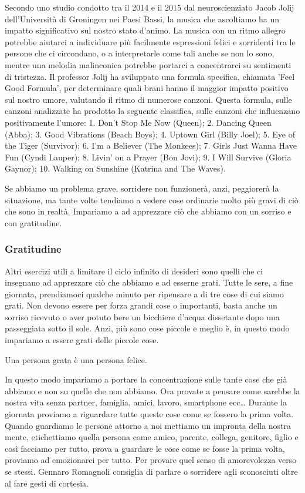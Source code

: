 \documentclass[12pt]{book} %
\begin{document}
Secondo uno studio condotto tra il 2014 e il 2015 dal neuroscienziato Jacob Jolij dell'Università di Groningen nei Paesi Bassi, la musica che ascoltiamo ha un impatto significativo sul nostro stato d'animo. La musica con un ritmo allegro potrebbe aiutarci a individuare più facilmente espressioni felici e sorridenti tra le persone che ci circondano, o a interpretarle come tali anche se non lo sono, mentre una melodia malinconica potrebbe portarci a concentrarci su sentimenti di tristezza. Il professor Jolij ha sviluppato una formula specifica, chiamata 'Feel Good Formula', per determinare quali brani hanno il maggior impatto positivo sul nostro umore, valutando il ritmo di numerose canzoni. Questa formula, sulle canzoni analizzate ha prodotto la seguente classifica, sulle canzoni che influenzano positivamente l'umore: 1. Don't Stop Me Now (Queen); 2. Dancing Queen (Abba); 3. Good Vibrations (Beach Boys); 4. Uptown Girl (Billy Joel); 5. Eye of the Tiger (Survivor); 6. I'm a Believer (The Monkees); 7. Girls Just Wanna Have Fun (Cyndi Lauper); 8. Livin' on a Prayer (Bon Jovi); 9. I Will Survive (Gloria Gaynor); 10. Walking on Sunshine (Katrina and The Waves).

Se abbiamo un problema grave, sorridere non funzionerà, anzi, peggiorerà la situazione, ma tante volte tendiamo a vedere
cose ordinarie molto più gravi di ciò che sono in realtà. Impariamo a ad apprezzare ciò che abbiamo con un sorriso e
con gratitudine.

\subsubsection{Gratitudine}
Altri esercizi utili a limitare il ciclo infinito
di desideri sono quelli che ci insegnano ad apprezzare ciò che abbiamo e ad esserne grati. Tutte le sere, a fine
giornata, prendiamoci qualche minuto per ripensare a di tre cose di cui siamo grati.
Non devono essere per forza grandi cose o importanti, basta anche un sorriso ricevuto o aver potuto bere un bicchiere
d'acqua dissetante dopo una passeggiata sotto il sole. Anzi, più
sono cose piccole e meglio è, in questo modo impariamo a essere grati delle piccole cose. 

Una persona grata è una persona felice. 

In questo modo impariamo a portare la concentrazione sulle tante cose che già abbiamo e non su quelle che non abbiamo.
Ora provate a pensare come sarebbe la nostra vita senza partner, famiglia, amici, lavoro, smartphone ecc… Durante la
giornata proviamo a riguardare tutte queste cose come se fossero la prima volta. Quando guardiamo le persone attorno a
noi mettiamo un impronta della nostra mente, etichettiamo quella persona come amico, parente, collega, genitore, figlio
e così facciamo per tutto, prova a guardare le cose come se fosse la prima volta, proviamo ad emozionarci per tutto.
Per provare quel senso di amorevolezza verso se stessi. Gennaro Romagnoli consiglia di parlare o sorridere agli
sconosciuti oltre al fare gesti di cortesia.
\end{document}
